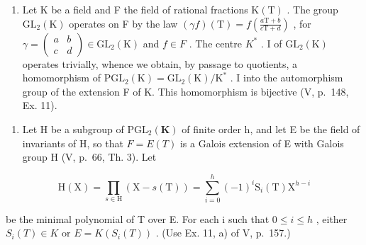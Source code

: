 \begin{enumerate}
\def\labelenumi{\arabic{enumi})}
\setcounter{enumi}{17}
\tightlist
\item
  Let K be a field and F the field of rational fractions \(\mathrm{K}(\mathrm{T})\) . The group \(\mathrm{GL}_{2}(\mathrm{K})\) operates on F by the law \((\gamma f)(\mathrm{T}) = f\left(\frac{a\mathrm{T} + b}{c\mathrm{T} + d}\right)\) , for \(\gamma = \begin{pmatrix} a & b \\ c & d \end{pmatrix} \in \mathrm{GL}_{2}(\mathrm{K})\) and \(f \in F\) . The centre \(K^{*}\) . I of \(\mathrm{GL}_{2}(\mathrm{K})\) operates trivially, whence we obtain, by passage to quotients, a homomorphism of \(\mathrm{PGL}_{2}(\mathrm{K}) = \mathrm{GL}_{2}(\mathrm{K}) / \mathrm{K}^{*}\) . I into the automorphism group of the extension F of K. This homomorphism is bijective (V, p.~148, Ex. 11).
\end{enumerate}

\begin{enumerate}
\def\labelenumi{\alph{enumi})}
\tightlist
\item
  Let H be a subgroup of \(\mathrm{PGL}_{2}(\mathbf{K})\) of finite order h, and let E be the field of invariants of H, so that \(F = E(T)\) is a Galois extension of E with Galois group H (V, p.~66, Th. 3). Let
\end{enumerate}

\[
\mathrm{H} (\mathrm{X}) = \prod_ {s \in \mathrm{H}} (\mathrm{X} - s (\mathrm{T})) = \sum_ {i = 0} ^ {h} (- 1) ^ {i} \mathrm{S} _ {i} (\mathrm{T}) \mathrm{X} ^ {h - i}
\]

be the minimal polynomial of T over E. For each i such that \(0 \leqslant i \leqslant h\) , either \(S_{i}(T) \in K\) or \(E = K(S_{i}(T))\) . (Use Ex. 11, a) of V, p.~157.)

